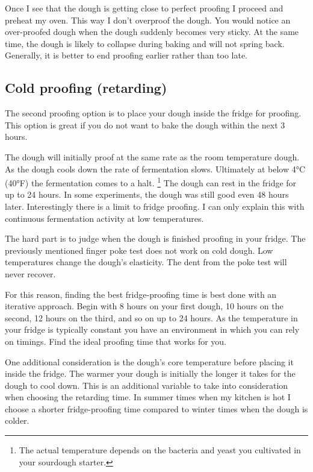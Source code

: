 Once I see that the dough is getting close to perfect proofing I proceed and
preheat my oven. This way I don't overproof the dough. You would notice an
over-proofed dough when the dough suddenly becomes very sticky. At the same
time, the dough is likely to collapse during baking and will not spring back.
Generally, it is better to end proofing earlier rather than too late.

\subsection{Cold proofing (retarding)}

The second proofing option is to place your dough inside the fridge for
proofing. This option is great if you do not want to bake the dough
within the next 3 hours.

The dough will initially proof at the same rate as the room temperature dough.
As the dough cools down the rate of fermentation slows. Ultimately at below
4°C (40°F) the fermentation comes to a halt. \footnote{The actual temperature
depends on the bacteria and yeast you cultivated in your sourdough
starter.} The dough can rest in the fridge for up to 24 hours. In some
experiments, the dough was still good even 48 hours later. Interestingly
there is a limit to fridge proofing. I can only explain this with continuous
fermentation activity at low temperatures.

The hard part is to judge when the dough is finished proofing in your fridge.
The previously mentioned finger poke test does not work on cold dough. Low
temperatures change the dough's elasticity. The dent from the poke test
will never recover.

For this reason, finding the best fridge-proofing time is best done
with an iterative approach. Begin with 8 hours on your first dough,
10 hours on the second, 12 hours on the third, and so on up to 24 hours.
As the temperature in your fridge is typically constant you have an
environment in which you can rely on timings. Find the ideal proofing
time that works for you.

One additional consideration is the dough's core temperature before
placing it inside the fridge. The warmer your dough is initially
the longer it takes for the dough to cool down. This is an additional
variable to take into consideration when choosing the retarding time.
In summer times when my kitchen is hot I choose a shorter fridge-proofing
time compared to winter times when the dough is colder.

